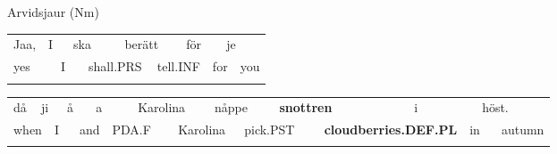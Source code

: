 \begin{listWWNumileveli}
\item 

\begin{styleExample}
Arvidsjaur (Nm)

\end{styleExample}

\end{listWWNumileveli}

\begin{tabular}{llllllllllll}
\lsptoprule
Jaa, & \multicolumn{2}{l}{I

} & \multicolumn{2}{l}{ska

} & \multicolumn{2}{l}{berätt

} & \multicolumn{2}{l}{för

} & \multicolumn{2}{l}{je

} & \\
\multicolumn{2}{l}{yes

} & \multicolumn{2}{l}{I

} & \multicolumn{2}{l}{shall.PRS

} & \multicolumn{2}{l}{tell.INF

} & \multicolumn{2}{l}{for

} & \multicolumn{2}{l}{you

}\\
\lspbottomrule
\end{tabular}

\begin{tabular}{llllllllllllllllll}
\lsptoprule
då & \multicolumn{2}{l}{ji

} & \multicolumn{2}{l}{å

} & \multicolumn{2}{l}{a

} & \multicolumn{2}{l}{Karolina

} & \multicolumn{2}{l}{nåppe

} & \multicolumn{2}{l}{{\bfseries snottren}

} & \multicolumn{2}{l}{i

} & \multicolumn{2}{l}{höst.

} & \\
\multicolumn{2}{l}{when

} & \multicolumn{2}{l}{I

} & \multicolumn{2}{l}{and

} & \multicolumn{2}{l}{PDA.F

} & \multicolumn{2}{l}{Karolina

} & \multicolumn{2}{l}{pick.PST

} & \multicolumn{2}{l}{{\bfseries cloudberries.DEF.PL}

} & \multicolumn{2}{l}{in

} & \multicolumn{2}{l}{autumn

}\\
\lspbottomrule
\end{tabular}

